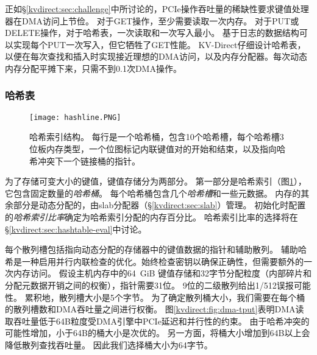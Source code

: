 正如\S \ref {kvdirect:sec:challenge}中所讨论的，PCIe操作吞吐量的稀缺性要求键值处理器在DMA访问上节俭。
对于GET操作，至少需要读取一次内存。
对于PUT或DELETE操作，对于哈希表，一次读取和一次写入最小。
基于日志的数据结构可以实现每个PUT一次写入，但它牺牲了GET性能。
KV-Direct仔细设计哈希表，以便在每次查找和插入时实现接近理想的DMA访问，以及内存分配器。每次动态内存分配平摊下来，只需不到0.1次DMA操作。

\subsubsection{哈希表}
\label{kvdirect:sec:hashtable}

\begin{figure}[t]
\centering
\texttt{[image: hashline.PNG]}
\caption{哈希索引结构。 每行是一个哈希桶，包含10个哈希槽，每个哈希槽3位板内存类型，一个位图标记内联键值对的开始和结束，以及指向哈希冲突下一个链接桶的指针。}
\label{kvdirect:fig:hashtable}

\end{figure}

为了存储可变大小的键值，键值存储分为两部分。 第一部分是哈希索引（图\ref {kvdirect:fig:hashtable}），它包含固定数量的\textit {哈希桶}。 每个哈希桶包含几个\textit {哈希槽}和一些元数据。 内存的其余部分是动态分配的，由slab分配器（\S \ref {kvdirect:sec:slab}）管理。
初始化时配置的\textit {哈希索引比率}确定为哈希索引分配的内存百分比。
哈希索引比率的选择将在\S \ref {kvdirect:sec:hashtable-eval}中讨论。


每个散列槽包括指向动态分配的存储器中的键值数据的指针和辅助散列。
辅助哈希是一种启用并行内联检查的优化。始终检查密钥以确保正确性，但需要额外的一次内存访问。
假设主机内存中的64~GiB 键值存储和32字节分配粒度（内部碎片和分配元数据开销之间的权衡），指针需要31位。
9位的二级散列给出1/512误报可能性。
累积地，散列槽大小是5个字节。
为了确定散列桶大小，我们需要在每个桶的散列槽数和DMA吞吐量之间进行权衡。
图\ref {kvdirect:fig:dma-tput}表明DMA读取吞吐量低于64B粒度受DMA引擎中PCIe延迟和并行性的约束。
由于哈希冲突的可能性增加，小于64B的桶大小是次优的。
另一方面，将桶大小增加到64B以上会降低散列查找吞吐量。
因此我们选择桶大小为64字节。

